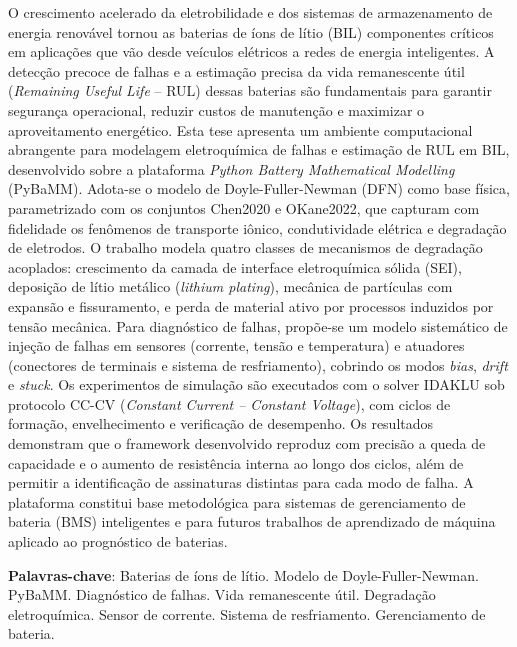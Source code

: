 \documentclass[
    12pt,
    openright,
    twoside,
    a4paper,
    brazil,
    english
]{abntex2}
\begin{document}
\setlength{\absparsep}{18pt}
\begin{resumo}
  O crescimento acelerado da eletrobilidade e dos sistemas de armazenamento de
  energia renovável tornou as baterias de íons de lítio (BIL) componentes
  críticos em aplicações que vão desde veículos elétricos a redes de energia
  inteligentes. A detecção precoce de falhas e a estimação precisa da vida
  remanescente útil (\textit{Remaining Useful Life} -- RUL) dessas baterias são
  fundamentais para garantir segurança operacional, reduzir custos de manutenção
  e maximizar o aproveitamento energético. Esta tese apresenta um ambiente
  computacional abrangente para modelagem eletroquímica de falhas e estimação de
  RUL em BIL, desenvolvido sobre a plataforma \textit{Python Battery Mathematical
  Modelling} (PyBaMM). Adota-se o modelo de Doyle-Fuller-Newman (DFN) como base
  física, parametrizado com os conjuntos Chen2020 e OKane2022, que capturam com
  fidelidade os fenômenos de transporte iônico, condutividade elétrica e
  degradação de eletrodos. O trabalho modela quatro classes de mecanismos de
  degradação acoplados: crescimento da camada de interface eletroquímica sólida
  (SEI), deposição de lítio metálico (\textit{lithium plating}), mecânica de
  partículas com expansão e fissuramento, e perda de material ativo por
  processos induzidos por tensão mecânica. Para diagnóstico de falhas, propõe-se
  um modelo sistemático de injeção de falhas em sensores (corrente, tensão e
  temperatura) e atuadores (conectores de terminais e sistema de resfriamento),
  cobrindo os modos \textit{bias}, \textit{drift} e \textit{stuck}. Os
  experimentos de simulação são executados com o solver IDAKLU sob protocolo
  CC-CV (\textit{Constant Current -- Constant Voltage}), com ciclos de
  formação, envelhecimento e verificação de desempenho. Os resultados demonstram
  que o framework desenvolvido reproduz com precisão a queda de capacidade e o
  aumento de resistência interna ao longo dos ciclos, além de permitir a
  identificação de assinaturas distintas para cada modo de falha. A plataforma
  constitui base metodológica para sistemas de gerenciamento de bateria (BMS)
  inteligentes e para futuros trabalhos de aprendizado de máquina aplicado ao
  prognóstico de baterias.

  \textbf{Palavras-chave}: Baterias de íons de lítio. Modelo de Doyle-Fuller-Newman.
  PyBaMM. Diagnóstico de falhas. Vida remanescente útil. Degradação eletroquímica.
  Sensor de corrente. Sistema de resfriamento. Gerenciamento de bateria.
\end{resumo}
\end{document}
